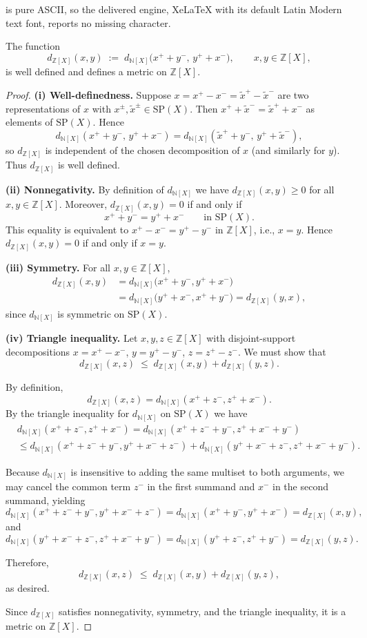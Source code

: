\documentclass[10pt,a4paper]{amsart}
\newcommand{\N}{\mathbb{N}}
\newcommand{\SP}{\mathrm{SP}}
\newcommand{\Z}{\mathbb{Z}}
\begin{document}
is pure ASCII, so the delivered engine, XeLaTeX with its default Latin Modern text font, reports no missing character.
\begin{proposition}\label{prop:Z[X]_metric}
The function
\[
d_{\Z[X]}(x,y)\;:=\; d_{\N[X]}\!\bigl(x^{+}+y^{-},\, y^{+}+x^{-}\bigr),
\qquad x,y\in \Z[X],
\]
is well defined and defines a metric on $\Z[X]$.
\end{proposition}

\begin{proof}
\noindent\textbf{(i) Well-definedness.}
Suppose $x = x^{+}-x^{-} = \tilde{x}^{+}-\tilde{x}^{-}$ are two
representations of $x$ with $x^{\pm},\tilde{x}^{\pm}\in \SP(X)$.
Then $x^{+}+\tilde{x}^{-} = \tilde{x}^{+}+x^{-}$ as elements of $\SP(X)$.
Hence
\[
d_{\N[X]}(x^{+}+y^{-},\, y^{+}+x^{-})
= d_{\N[X]}(\tilde{x}^{+}+y^{-},\, y^{+}+\tilde{x}^{-}),
\]
so $d_{\Z[X]}$ is independent of the chosen decomposition of $x$ (and similarly
for $y$). Thus $d_{\Z[X]}$ is well defined.

\smallskip
\noindent\textbf{(ii) Nonnegativity.}
By definition of $d_{\N[X]}$ we have $d_{\Z[X]}(x,y)\ge 0$ for all $x,y\in \Z[X]$.
Moreover, $d_{\Z[X]}(x,y)=0$ if and only if
\[
x^{+}+y^{-} = y^{+}+x^{-}
\qquad \text{in } \SP(X).
\]
This equality is equivalent to $x^{+}-x^{-}=y^{+}-y^{-}$ in $\Z[X]$, i.e.,
$x=y$. Hence $d_{\Z[X]}(x,y)=0$ if and only if $x=y$.

\smallskip
\noindent\textbf{(iii) Symmetry.}
For all $x,y\in \Z[X]$,
\begin{align*}
d_{\Z[X]}(x,y)
&= d_{\N[X]}\!\bigl(x^{+}+y^{-},y^{+}+x^{-}\bigr) \\
&= d_{\N[X]}\!\bigl(y^{+}+x^{-},x^{+}+y^{-}\bigr)
= d_{\Z[X]}(y,x),
\end{align*}
since $d_{\N[X]}$ is symmetric on $\SP(X)$.

\smallskip
\noindent\textbf{(iv) Triangle inequality.}
Let $x,y,z \in \Z[X]$ with disjoint-support decompositions
$x = x^+ - x^-$, $y = y^+ - y^-$, $z = z^+ - z^-$. 
We must show that
\[
d_{\Z[X]}(x,z) \;\le\; d_{\Z[X]}(x,y) + d_{\Z[X]}(y,z).
\]

By definition,
\[
d_{\Z[X]}(x,z) = d_{\N[X]}(x^+ + z^-, z^+ + x^-).
\]
By the triangle inequality for $d_{\N[X]}$ on $\SP(X)$ we have
\begin{align*}
&d_{\N[X]}(x^+ + z^-, z^+ + x^-)=d_{\N[X]}(x^+ + z^- + y^-, z^+ + x^- + y^-)
\\ &\leq 
d_{\N[X]}(x^+ + z^- + y^-, y^+ + x^- + z^-) + d_{\N[X]}(y^+ + x^- + z^-, z^+ + x^- + y^-).
\end{align*}

Because $d_{\N[X]}$ is insensitive to adding the same multiset to both arguments,
we may cancel the common term $z^-$ in the first summand and $x^-$ in the
second summand, yielding
\[
d_{\N[X]}(x^+ + z^- + y^-, y^+ + x^- + z^-) = d_{\N[X]}(x^+ + y^-, y^+ + x^-)
= d_{\Z[X]}(x,y),
\]
and
\[
d_{\N[X]}(y^+ + x^- + z^-, z^+ + x^- + y^-) = d_{\N[X]}(y^+ + z^-, z^+ + y^-)
= d_{\Z[X]}(y,z).
\]

Therefore,
\[
d_{\Z[X]}(x,z) \;\le\; d_{\Z[X]}(x,y) + d_{\Z[X]}(y,z),
\]
as desired.

\smallskip
Since $d_{\Z[X]}$ satisfies nonnegativity, symmetry, and the triangle inequality, it is a metric on $\Z[X]$.
\end{proof}
\end{document}
